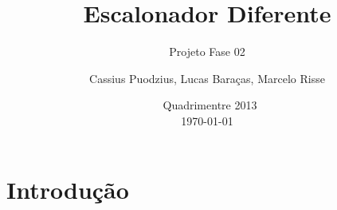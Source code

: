 \documentclass[a4paper]{scrartcl}
\title{Escalonador Diferente}
\subtitle{Projeto Fase 02}
\author{Cassius Puodzius, Lucas Baraças, Marcelo Risse}
\date{\segundo~Quadrimentre 2013\\\today}
\begin{document}
\maketitle

\begin{abstract}
\end{abstract}

\tableofcontents
\pagebreak[4]

\section{Introdução}
\end{document}
